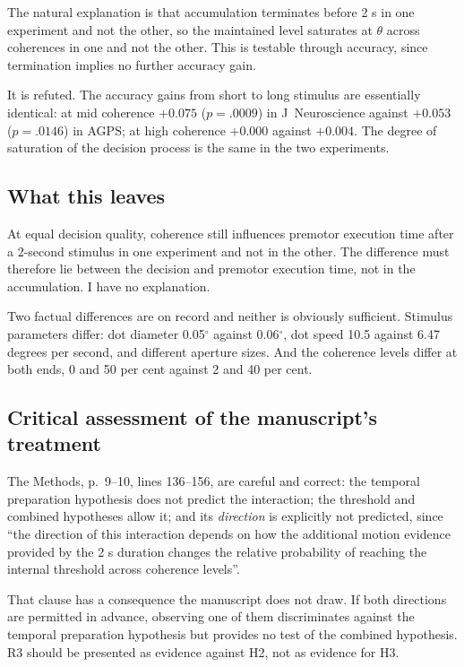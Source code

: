 \documentclass[11pt,a4paper]{article}
\theoremstyle{plain}
\theoremstyle{remark}
\begin{document}
The natural explanation is that accumulation terminates before 2 s in one experiment and not
the other, so the maintained level saturates at $\theta$ across coherences in one and not
the other. This is testable through accuracy, since termination implies no further accuracy
gain.

It is refuted. The accuracy gains from short to long stimulus are essentially identical: at
mid coherence $+0.075$ ($p=.0009$) in J~Neuroscience against $+0.053$ ($p=.0146$) in AGPS;
at high coherence $+0.000$ against $+0.004$. The degree of saturation of the decision process
is the same in the two experiments.

\subsection{What this leaves}

At equal decision quality, coherence still influences premotor execution time after a
2-second stimulus in one experiment and not in the other. The difference must therefore lie
between the decision and premotor execution time, not in the accumulation. I have no
explanation.

Two factual differences are on record and neither is obviously sufficient. Stimulus
parameters differ: dot diameter 0.05$^\circ$ against 0.06$^\circ$, dot speed 10.5 against
6.47 degrees per second, and different aperture sizes. And the coherence levels differ at
both ends, 0 and 50 per cent against 2 and 40 per cent.

\subsection{Critical assessment of the manuscript's treatment}

The Methods, p.~9--10, lines 136--156, are careful and correct: the temporal preparation
hypothesis does not predict the interaction; the threshold and combined hypotheses allow it;
and its \emph{direction} is explicitly not predicted, since ``the direction of this
interaction depends on how the additional motion evidence provided by the 2 s duration
changes the relative probability of reaching the internal threshold across coherence
levels''.

That clause has a consequence the manuscript does not draw. If both directions are permitted
in advance, observing one of them discriminates against the temporal preparation hypothesis
but provides no test of the combined hypothesis. R3 should be presented as evidence against
H2, not as evidence for H3.
\end{document}
